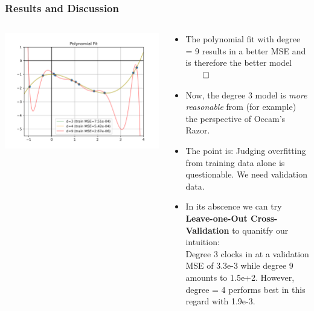 \documentclass[10pt,aspectratio=169,handout]{beamer}
\begin{document}
\begin{frame}
    \frametitle{Results and Discussion}

    \begin{columns}
    \begin{column}{0.4\textwidth}
        \includegraphics[width=1.2\textwidth]{images/task-5-1-2.png}
    \end{column}
    \begin{column}{0.6\textwidth}
        \begin{itemize}
            \item The polynomial fit with degree = 9 results in a better MSE and is therefore the better model $\qed$
            \item Now, the degree 3 model is \textit{more reasonable} from (for example) the perspective of Occam's Razor.
            \item The point is: Judging overfitting from training data alone is questionable. We need validation data.
            \item In its abscence we can try \textbf{Leave-one-Out Cross-Validation} to quanitfy our intuition: \\
                    Degree 3 clocks in at a validation MSE of 3.3e-3 while degree 9 amounts to 1.5e+2. However, degree = 4 performs 
                    best in this regard with 1.9e-3.
        \end{itemize}
    \end{column}
    
    \end{columns}

\end{frame}
\end{document}
